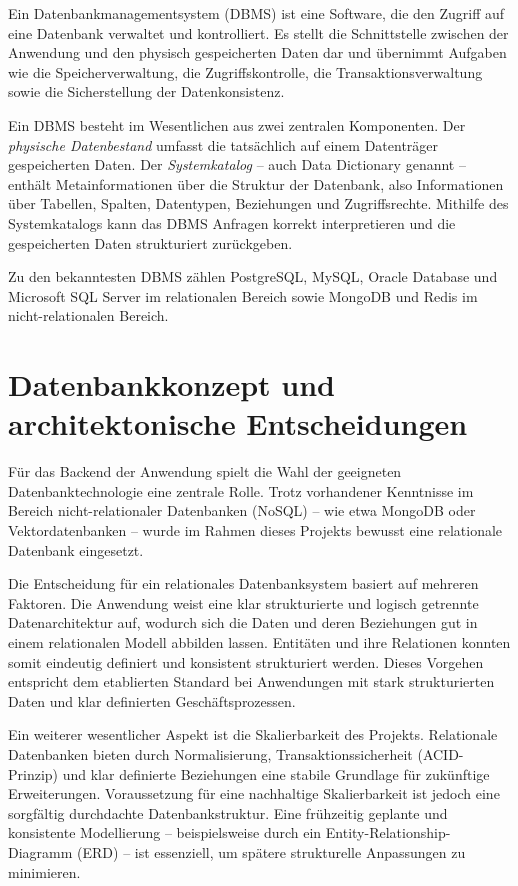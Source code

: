 Ein Datenbankmanagementsystem (DBMS) ist eine Software, die den Zugriff auf eine
Datenbank verwaltet und kontrolliert. Es stellt die Schnittstelle zwischen der
Anwendung und den physisch gespeicherten Daten dar und übernimmt Aufgaben wie
die Speicherverwaltung, die Zugriffskontrolle, die Transaktionsverwaltung sowie
die Sicherstellung der Datenkonsistenz.

Ein DBMS besteht im Wesentlichen aus zwei zentralen Komponenten. Der
\textit{physische Datenbestand} umfasst die tatsächlich auf einem Datenträger
gespeicherten Daten. Der \textit{Systemkatalog} -- auch Data Dictionary genannt
-- enthält Metainformationen über die Struktur der Datenbank, also Informationen
über Tabellen, Spalten, Datentypen, Beziehungen und Zugriffsrechte. Mithilfe des
Systemkatalogs kann das DBMS Anfragen korrekt interpretieren und die gespeicherten
Daten strukturiert zurückgeben.

Zu den bekanntesten DBMS zählen PostgreSQL, MySQL, Oracle Database und
Microsoft SQL Server im relationalen Bereich sowie MongoDB und Redis im
nicht-relationalen Bereich.

\section{Datenbankkonzept und architektonische Entscheidungen}

Für das Backend der Anwendung spielt die Wahl der geeigneten Datenbanktechnologie
eine zentrale Rolle. Trotz vorhandener Kenntnisse im Bereich nicht-relationaler
Datenbanken (NoSQL) -- wie etwa MongoDB oder Vektordatenbanken -- wurde im Rahmen
dieses Projekts bewusst eine relationale Datenbank eingesetzt.

Die Entscheidung für ein relationales Datenbanksystem basiert auf mehreren Faktoren.
Die Anwendung weist eine klar strukturierte und logisch getrennte Datenarchitektur
auf, wodurch sich die Daten und deren Beziehungen gut in einem relationalen Modell
abbilden lassen. Entitäten und ihre Relationen konnten somit eindeutig definiert
und konsistent strukturiert werden. Dieses Vorgehen entspricht dem etablierten
Standard bei Anwendungen mit stark strukturierten Daten und klar definierten
Geschäftsprozessen.

Ein weiterer wesentlicher Aspekt ist die Skalierbarkeit des Projekts. Relationale
Datenbanken bieten durch Normalisierung, Transaktionssicherheit (ACID-Prinzip) und
klar definierte Beziehungen eine stabile Grundlage für zukünftige Erweiterungen.
Voraussetzung für eine nachhaltige Skalierbarkeit ist jedoch eine sorgfältig
durchdachte Datenbankstruktur. Eine frühzeitig geplante und konsistente Modellierung
-- beispielsweise durch ein Entity-Relationship-Diagramm (ERD) -- ist essenziell,
um spätere strukturelle Anpassungen zu minimieren.


